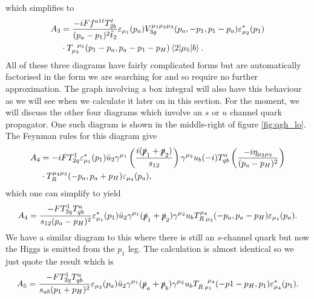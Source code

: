 which simplifies to
\begin{equation}
\begin{split}
A_3 &= \frac{-iF f^{a1t}T^t_{2b}}{(p_a-p_1)^2 \hat{t}_2} \varepsilon_{\mu_1}(p_a)V_{3g}^{\mu_1 \mu_2 \mu_3}(p_a, -p_1, p_1 - p_a)  \varepsilon_{\mu_2}^*(p_1)\\
& \cdot T_{\mu_3}^{\hspace{5pt}\mu_5}(p_1-p_a,p_a-p_1-p_H) \mathinner{\langle2\vert\mu_5\vert b\rangle}_{}.
\end{split}
\end{equation}
All of these three diagrams have fairly complicated forms but are automatically factorised in the form we are searching for and so require no further approximation. The graph involving a box integral will also have this behaviour as we will see when we calculate it later on in this section. For the moment, we will discuss the other four diagrams which involve an $s$ or $u$ channel quark propagator. One such diagram is shown in the middle-right of figure \ref{fig:qgh_lo}. The Feynman rules for this diagram give
\begin{equation}
\begin{split}
A_4 &= -i FT^{1}_{2q} \varepsilon_{\mu_1}^*(p_1) \bar{u}_2 \gamma^{\mu_1}  \left(\frac{i(\slashed{p}_1+\slashed{p}_2)}{s_{12}}\right) \gamma^{\mu_2}u_b (-i)T^{a}_{qb} \left(\frac{-i \eta_{\mu_2 \mu_3}}{(p_a-p_H)^2} \right)\\
&\cdot T_R^{\mu_4 \mu_3}(-p_a,p_a+p_H)\varepsilon_{\mu_4}(p_a),
\end{split}
\end{equation}
which one can simplify to yield
\begin{equation}
A_4 = \frac{- F T^1_{2q}T^a_{qb}}{s_{12}(p_a-p_H)^2} \varepsilon^*_{\mu_1}(p_1) \bar{u}_2 \gamma^{\mu_1}(\slashed{p}_1+\slashed{p}_2)\gamma^{\mu_2}u_b T_{R \hspace{2pt} \mu_2}^{\mu_4}(-p_a,p_a-p_H)\varepsilon_{\mu_4}(p_a).
\end{equation}
We have a similar diagram to this where there is still an $s$-channel quark but now the Higgs is emitted from the $p_1$ leg. The calculation is almost identical so we just quote the result which is
\begin{equation}
A_5 = \frac{- F T^1_{2q}T^a_{qb}}{s_{ab}(p_1+p_H)^2} \varepsilon_{\mu_2}(p_a) \bar{u}_2 \gamma^{\mu_1}(\slashed{p}_a+\slashed{p}_b)\gamma^{\mu_2}u_b T_{R \hspace{2pt}  \mu_1}^{\hspace{10pt} \mu_4}(-p1-p_H,p_1)\varepsilon_{\mu_4}^*(p_1).
\end{equation}
